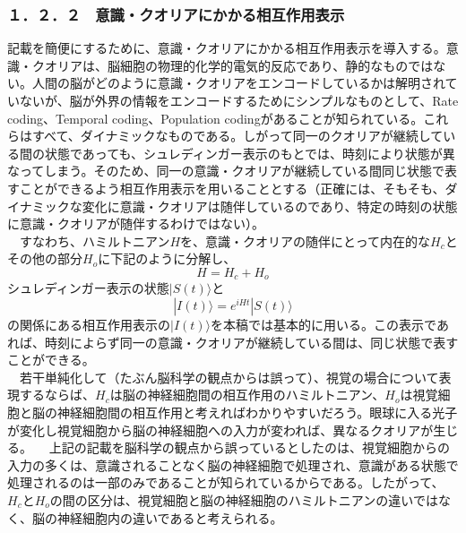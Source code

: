 \subsubsection{１．２．２　意識・クオリアにかかる相互作用表示}
記載を簡便にするために、意識・クオリアにかかる相互作用表示を導入する。意識・クオリアは、脳細胞の物理的化学的電気的反応であり、静的なものではない。人間の脳がどのように意識・クオリアをエンコードしているかは解明されていないが、脳が外界の情報をエンコードするためにシンプルなものとして、Rate coding、Temporal coding、Population codingがあることが知られている\cite{wikipediac}。これらはすべて、ダイナミックなものである。しがって同一のクオリアが継続している間の状態であっても、シュレディンガー表示のもとでは、時刻により状態が異なってしまう。そのため、同一の意識・クオリアが継続している間同じ状態で表すことができるよう相互作用表示を用いることとする（正確には、そもそも、ダイナミックな変化に意識・クオリアは随伴しているのであり、特定の時刻の状態に意識・クオリアが随伴するわけではない）。\\
　すなわち、ハミルトニアン$H$を、意識・クオリアの随伴にとって内在的な$H_c$とその他の部分$H_o$に下記のように分解し、
　\begin{equation}
  H=H_c + H_o
\end{equation}
シュレディンガー表示の状態$|S(t)\rangle$と
　\begin{equation}
  |I(t)\rangle = e^{iHt}|S(t)\rangle
\end{equation}
の関係にある相互作用表示の$|I(t)\rangle$を本稿では基本的に用いる。この表示であれば、時刻によらず同一の意識・クオリアが継続している間は、同じ状態で表すことができる。\\
　若干単純化して（たぶん脳科学の観点からは誤って）、視覚の場合について表現するならば、$H_c$は脳の神経細胞間の相互作用のハミルトニアン、$H_o$は視覚細胞と脳の神経細胞間の相互作用と考えればわかりやすいだろう。眼球に入る光子が変化し視覚細胞から脳の神経細胞への入力が変われば、異なるクオリアが生じる。
　上記の記載を脳科学の観点から誤っているとしたのは、視覚細胞からの入力の多くは、意識されることなく脳の神経細胞で処理され、意識がある状態で処理されるのは一部のみであることが知られているからである。したがって、$H_c$と$H_o$の間の区分は、視覚細胞と脳の神経細胞のハミルトニアンの違いではなく、脳の神経細胞内の違いであると考えられる。